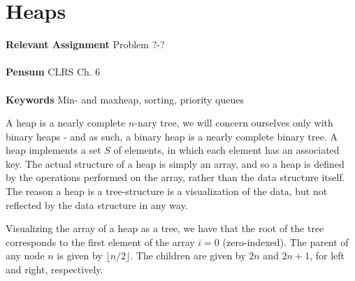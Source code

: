 
\chapter{Heaps}
\label{ch:heaps}

\textbf{Relevant Assignment} Problem ?-?\\\\
\textbf{Pensum} CLRS Ch. 6\\\\
\textbf{Keywords} Min- and maxheap, sorting, priority queues
\vspace{1in}

\noindent A heap is a nearly complete $n$-nary tree, we will concern ourselves
only with binary heaps - and as such, a binary heap is a nearly complete
binary tree. A heap implements a set $S$ of elements, in which each element
has an associated key. The actual structure of a heap is simply an array, and
so a heap is defined by the operations performed on the array, rather than the
data structure itself. The reason a heap is a tree-structure is a
visualization of the data, but not reflected by the data structure in any way.

Visualizing the array of a heap as a tree, we have that the root of the tree
corresponds to the first element of the array $i = 0$ (zero-indexed). The
parent of any node $n$ is given by $\lfloor n/2 \rfloor$. The children are
given by $2n$ and $2n + 1$, for left and right, respectively.

